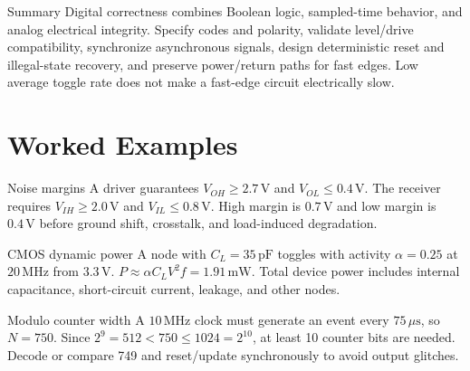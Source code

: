 \documentclass[10pt,letterpaper]{article}
\begin{document}
\begin{CornellNotesTable}
\end{CornellNotesTable}
\begin{CornellSummaryBox}{Summary}
Digital correctness combines Boolean logic, sampled-time behavior, and analog electrical integrity. Specify codes and polarity, validate level/drive compatibility, synchronize asynchronous signals, design deterministic reset and illegal-state recovery, and preserve power/return paths for fast edges. Low average toggle rate does not make a fast-edge circuit electrically slow.
\end{CornellSummaryBox}
\section{Worked Examples}
\begin{CornellExamBox}{Noise margins}
A driver guarantees $V_{OH}\ge2.7\,\mathrm{V}$ and $V_{OL}\le0.4\,\mathrm{V}$. The receiver requires $V_{IH}\ge2.0\,\mathrm{V}$ and $V_{IL}\le0.8\,\mathrm{V}$. High margin is $0.7\,\mathrm{V}$ and low margin is $0.4\,\mathrm{V}$ before ground shift, crosstalk, and load-induced degradation.
\end{CornellExamBox}
\begin{CornellExamBox}{CMOS dynamic power}
A node with $C_L=35\,\mathrm{pF}$ toggles with activity $\alpha=0.25$ at $20\,\mathrm{MHz}$ from $3.3\,\mathrm{V}$. $P\approx\alpha C_LV^2f=1.91\,\mathrm{mW}$. Total device power includes internal capacitance, short-circuit current, leakage, and other nodes.
\end{CornellExamBox}
\begin{CornellExamBox}{Modulo counter width}
A $10\,\mathrm{MHz}$ clock must generate an event every $75\,\mu\mathrm{s}$, so $N=750$. Since $2^9=512<750\le1024=2^{10}$, at least 10 counter bits are needed. Decode or compare 749 and reset/update synchronously to avoid output glitches.
\end{CornellExamBox}
\end{document}

